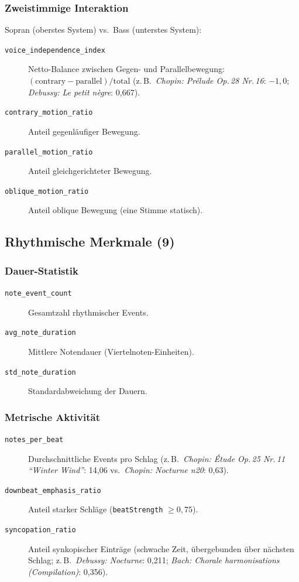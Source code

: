 \documentclass[12pt,a4paper]{article}
\theoremstyle{definition}
\begin{document}
\subsubsection*{Zweistimmige Interaktion}
Sopran (oberstes System) vs.\ Bass (unterstes System):
\begin{description}
    \item[\texttt{voice\_independence\_index}] Netto-Balance zwischen Gegen- und Parallelbewegung: $(\text{contrary}  - \text{parallel}) / \text{total}$ (z.\,B.\ \emph{Chopin: Prélude Op.\,28 Nr.\,16}: $-1{,}0$; \emph{Debussy: Le petit nègre}: 0{,}667).
    
    \item[\texttt{contrary\_motion\_ratio}] Anteil gegenläufiger Bewegung.
    
    \item[\texttt{parallel\_motion\_ratio}] Anteil gleichgerichteter Bewegung.
    
    \item[\texttt{oblique\_motion\_ratio}] Anteil oblique Bewegung (eine Stimme statisch).
\end{description}

\subsection{Rhythmische Merkmale (9)}

\subsubsection*{Dauer-Statistik}
\begin{description}
    \item[\texttt{note\_event\_count}] Gesamtzahl rhythmischer Events.
    
    \item[\texttt{avg\_note\_duration}] Mittlere Notendauer (Viertelnoten-Einheiten).
    
    \item[\texttt{std\_note\_duration}] Standardabweichung der Dauern.
\end{description}

\subsubsection*{Metrische Aktivität}
\begin{description}
    \item[\texttt{notes\_per\_beat}] Durchschnittliche Events pro Schlag (z.\,B.\ \emph{Chopin: Étude Op.\,25 Nr.\,11 \enquote{Winter Wind}}: 14{,}06 vs.\ \emph{Chopin: Nocturne n20}: 0{,}63).
    
    \item[\texttt{downbeat\_emphasis\_ratio}] Anteil starker Schläge (\texttt{beatStrength} $\geq 0{,}75$).
    
    \item[\texttt{syncopation\_ratio}] Anteil synkopischer Einträge (schwache Zeit, übergebunden über nächsten Schlag; z.\,B.\ \emph{Debussy: Nocturne}: 0{,}211; \emph{Bach: Chorale harmonisations (Compilation)}: 0{,}356).
\end{description}
\end{document}
